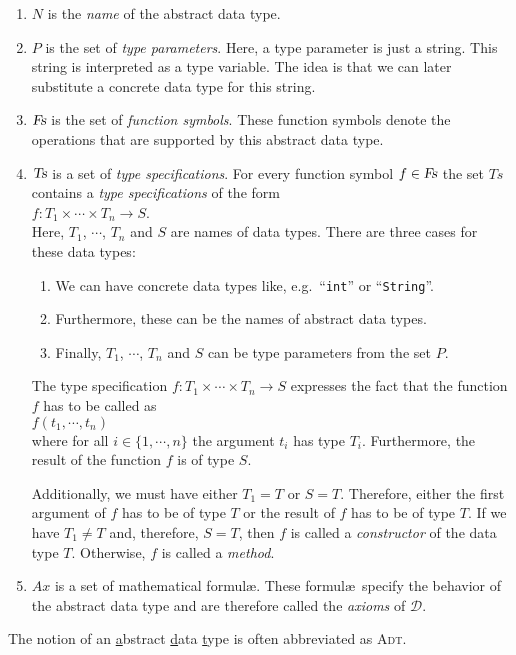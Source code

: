 \begin{enumerate}
\item $N$ is the \emph{name} of the abstract data type.
\item $P$ is the set of \emph{type parameters}.   Here, a type parameter is just a string.
      This string is interpreted as a type variable.  The idea is that we can later substitute 
      a concrete data type for this string.
\item $\textsl{Fs}$ is the set of \emph{function symbols}.  These function symbols denote the 
      operations that are supported by this abstract data type.
\item $\textsl{Ts}$ is a set of \emph{type specifications}.  For every function symbol
      $f \in \textsl{Fs}$
      the set $Ts$ contains a \emph{type specifications} of the form 
      \\[0.2cm]
      \hspace*{1.3cm} 
      $f: T_1 \times \cdots \times T_n \rightarrow S$. 
      \\[0.2cm]
      Here,  $T_1$, $\cdots$, $T_n$ and $S$ are names of data types.  There are three cases for
      these data types: 
      \begin{enumerate}
      \item We can have concrete data types like, e.g.~``\texttt{int}'' or ``\texttt{String}''.
      \item Furthermore, these can be the names of abstract data types.
      \item Finally,  $T_1$, $\cdots$, $T_n$ and $S$ can be type parameters from the set $P$.
      \end{enumerate}
      The type specification $f: T_1 \times \cdots \times T_n \rightarrow S$ expresses the fact that
      the function $f$ has to be called as \\[0.2cm] 
      \hspace*{1.3cm}
      $f(t_1,\cdots,t_n)$ 
      \\[0.2cm]
      where for all $i \in \{1,\cdots,n\}$ the argument $t_i$ has type 
      $T_i$.  Furthermore, the result of the function $f$ is of type $S$.

      Additionally, we must have either $T_1 = T$ or $S = T$.  Therefore, either
      the first argument of $f$ has to be of type $T$ or the result of $f$ has to be of type 
      $T$.  If we have  $T_1 \not= T$ and, therefore, $S = T$,
      then $f$ is called a \emph{constructor} of the data type $T$.  Otherwise,
      $f$ is called a  \emph{method}.
\item $Ax$ is a set of mathematical formul\ae.   These formul\ae\ 
      specify the behavior of the abstract data type and are therefore called
      the \emph{axioms} of $\mathcal{D}$.
\end{enumerate}
The notion of an \underline{a}bstract \underline{d}ata \underline{t}ype is often abbreviated as \textsc{Adt}.

